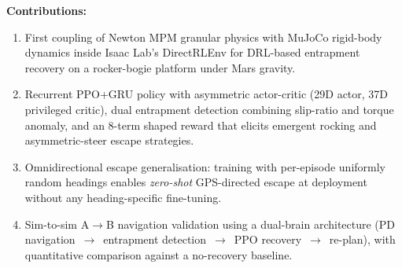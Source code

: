\documentclass[conference]{IEEEtran}
\begin{document}
\textbf{Contributions:}
\begin{enumerate}
  \item First coupling of Newton MPM granular physics with MuJoCo rigid-body
        dynamics inside Isaac Lab's DirectRLEnv for DRL-based entrapment recovery
        on a rocker-bogie platform under Mars gravity.
  \item Recurrent PPO+GRU policy with asymmetric actor-critic (29D actor,
        37D privileged critic), dual entrapment detection combining slip-ratio
        and torque anomaly, and an 8-term shaped reward that elicits emergent
        rocking and asymmetric-steer escape strategies.
  \item Omnidirectional escape generalisation: training with per-episode uniformly
        random headings enables \emph{zero-shot} GPS-directed escape at deployment
        without any heading-specific fine-tuning.
  \item Sim-to-sim A$\to$B navigation validation using a dual-brain architecture
        (PD navigation~$\to$~entrapment detection~$\to$~PPO recovery~$\to$~re-plan),
        with quantitative comparison against a no-recovery baseline.
\end{enumerate}
\end{document}
